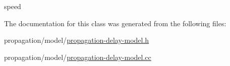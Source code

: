 speed 



The documentation for this class was generated from the following files\+:\begin{DoxyCompactItemize}
\item 
propagation/model/\hyperlink{propagation-delay-model_8h}{propagation-\/delay-\/model.\+h}\item 
propagation/model/\hyperlink{propagation-delay-model_8cc}{propagation-\/delay-\/model.\+cc}\end{DoxyCompactItemize}
